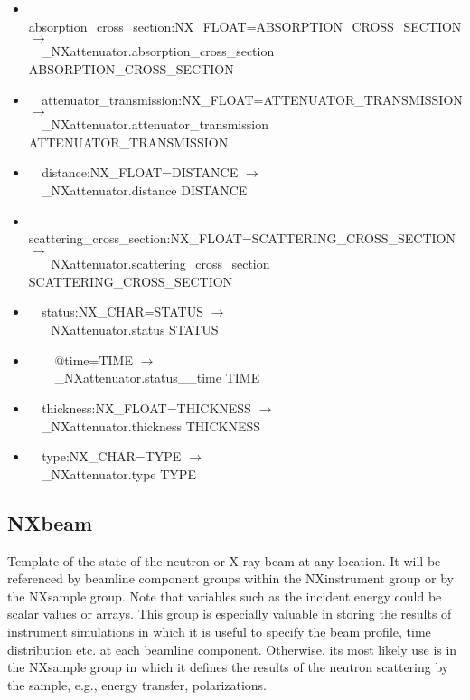 \documentclass[11pt]{article}
\begin{document}
{{\begin{itemize}
\item{\verb|  |absorption\_cross\_section:NX\_FLOAT=ABSORPTION\_CROSS\_SECTION $\rightarrow$\\
\verb|  |\_NXattenuator.absorption\_cross\_section ABSORPTION\_CROSS\_SECTION}

\item{\verb|  |attenuator\_transmission:NX\_FLOAT=ATTENUATOR\_TRANSMISSION $\rightarrow$\\
\verb|  |\_NXattenuator.attenuator\_transmission ATTENUATOR\_TRANSMISSION}

\item{\verb|  |distance:NX\_FLOAT=DISTANCE $\rightarrow$\\
\verb|  |\_NXattenuator.distance DISTANCE}

\item{\verb|  |scattering\_cross\_section:NX\_FLOAT=SCATTERING\_CROSS\_SECTION $\rightarrow$\\
\verb|  |\_NXattenuator.scattering\_cross\_section SCATTERING\_CROSS\_SECTION}

\item{\verb|  |status:NX\_CHAR=STATUS $\rightarrow$\\
\verb|  |\_NXattenuator.status STATUS}

\item{\verb|    |@time=TIME $\rightarrow$\\
\verb|    |\_NXattenuator.status\_\_time TIME}

\item{\verb|  |thickness:NX\_FLOAT=THICKNESS $\rightarrow$\\
\verb|  |\_NXattenuator.thickness THICKNESS}

\item{\verb|  |type:NX\_CHAR=TYPE $\rightarrow$\\
\verb|  |\_NXattenuator.type TYPE}
\end{itemize}
\subsection{NXbeam}

Template of the state of the neutron or X-ray beam at any location. It will be referenced by beamline component groups within the NXinstrument group or by the NXsample group. Note that variables such as the incident energy could be scalar values or arrays. This group is especially valuable in storing the results of instrument simulations in which it is useful to specify the beam profile, time distribution etc. at each beamline component. Otherwise, its most likely use is in the NXsample group in which it defines the results of the neutron scattering by the sample, e.g., energy transfer, polarizations.

}}
\end{document}
